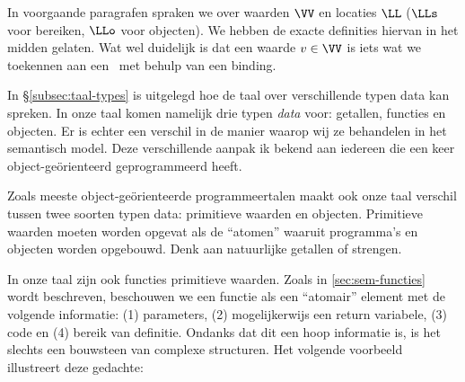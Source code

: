 In voorgaande paragrafen spraken we over waarden $\VV$ en locaties $\LL$ ($\LLs$ voor bereiken, $\LLo$ voor objecten). We hebben de exacte definities hiervan in het midden gelaten. Wat wel duidelijk is dat een waarde $v \in \VV$ is iets wat we toekennen aan een \Id\ met behulp van een binding.

In §\ref{subsec:taal-types} is uitgelegd hoe de taal over verschillende typen data kan spreken. In onze taal komen namelijk drie typen \emph{data} voor: getallen, functies en objecten. Er is echter een verschil in de manier waarop wij ze behandelen in het semantisch model. Deze verschillende aanpak ik bekend aan iedereen die een keer object-geörienteerd geprogrammeerd heeft.

Zoals meeste object-geörienteerde programmeertalen maakt ook onze taal verschil tussen twee soorten typen data: primitieve waarden en objecten. Primitieve waarden moeten worden opgevat als de ``atomen'' waaruit programma's en objecten worden opgebouwd. Denk aan natuurlijke getallen of strengen.

\begin{NoBreak}
  \codeFragmentCaption
\end{NoBreak}

In onze taal zijn ook functies primitieve waarden. Zoals in \ref{sec:sem-functies} wordt beschreven, beschouwen we een functie als een ``atomair'' element met de volgende informatie: (1) parameters, (2) mogelijkerwijs een return variabele, (3) code en (4) bereik van definitie. Ondanks dat dit een hoop informatie is, is het slechts een bouwsteen van complexe structuren. Het volgende voorbeeld illustreert deze gedachte:

\begin{NoBreak}
  \codeFragmentCaption
\end{NoBreak}

